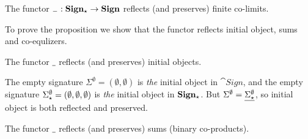 \begin{proposition}\label{prop:finco}
The functor ${\sf {_-}}:{\bf Sign_\star} \to {\bf Sign}$ reflects (and
preserves) finite co-limits.
\end{proposition}
%
To prove the proposition we show that the functor reflects initial object, sums and co-equlizers.

\begin{lemma}
The functor $\underline{\ }$ reflects (and preserves) initial objects.
\end{lemma}
%
\begin{PROOF}
The empty signature $\Sigma^\emptyset=(\emptyset,\emptyset)$ is {\em the}
initial object in 
$\cat{Sign}$, and the empty signature
$\Sigma_\star^\emptyset=(\emptyset,\emptyset,\emptyset)$ is {\em the} initial
object in
${\bf Sign_\star}$.
But $\Sigma^\emptyset=\underline{\Sigma_\star^\emptyset}$, so initial object is
both reflected and preserved.
\end{PROOF}%
%
\begin{lemma} The functor $\underline{\ }$ reflects (and preserves) sums (binary co-products).
\end{lemma}
%
